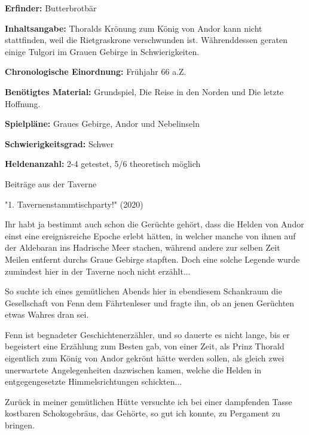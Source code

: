 {

\textbf{Erfinder:} Butterbrotbär

\textbf{Inhaltsangabe:} Thoralds Krönung zum König von Andor kann nicht stattfinden, weil die Rietgraskrone verschwunden ist. Währenddessen geraten einige Tulgori im Grauen Gebirge in Schwierigkeiten.

\textbf{Chronologische Einordnung:} Frühjahr 66 a.Z.

\textbf{Benötigtes Material:} Grundspiel, Die Reise in den Norden und Die letzte Hoffnung.

\textbf{Spielpläne:} Graues Gebirge, Andor und Nebelinseln

\textbf{Schwierigkeitsgrad:} Schwer

\textbf{Heldenanzahl:} 2-4 getestet, 5/6 theoretisch möglich



\begin{center}
    Beiträge aus der Taverne

    "1. Tavernenstammtischparty!" (2020)
\end{center}


Ihr habt ja bestimmt auch schon die Gerüchte gehört, dass die Helden von Andor einst eine ereignisreiche Epoche erlebt hätten, in welcher manche von ihnen auf der Aldebaran ins Hadrische Meer stachen, während andere zur selben Zeit Meilen entfernt durchs Graue Gebirge stapften. Doch eine solche Legende wurde zumindest hier in der Taverne noch nicht erzählt...

So suchte ich eines gemütlichen Abends hier in ebendiesem Schankraum die Gesellschaft von Fenn dem Fährtenleser und fragte ihn, ob an jenen Gerüchten etwas Wahres dran sei.


Fenn ist begnadeter Geschichtenerzähler, und so dauerte es nicht lange, bis er begeistert eine Erzählung zum Besten gab, von einer Zeit, als Prinz Thorald eigentlich zum König von Andor gekrönt hätte werden sollen, als gleich zwei unerwartete Angelegenheiten dazwischen kamen, welche die Helden in entgegengesetzte Himmelsrichtungen schickten...

Zurück in meiner gemütlichen Hütte versuchte ich bei einer dampfenden Tasse kostbaren Schokogebräus, das Gehörte, so gut ich konnte, zu Pergament zu bringen.

}
